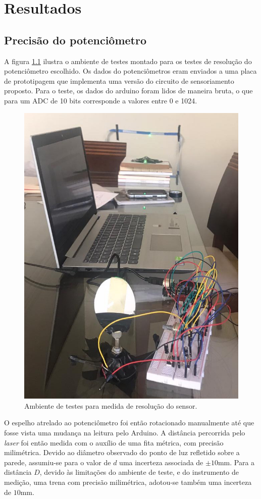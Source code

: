 \chapter{Resultados}

\label{CapResultados}

\section{Precisão do potenciômetro}
A figura \ref{fig:result-resolution} ilustra o ambiente de testes montado para os
testes de resolução do potenciômetro escolhido. Os dados do potenciômetros eram 
enviados a uma placa de prototipagem que implementa uma versão do circuito
de sensoriamento proposto. Para o teste, os dados do arduino foram lidos de 
maneira bruta, o que para um ADC de 10 bits corresponde a valores entre 0 e 1024.

\begin{figure}[h]
    \caption{Ambiente de testes para medida de resolução do sensor.}

    \begin{centering}
        \includegraphics[width=0.5\columnwidth]{images/resultados/resolution.jpg} 
    \par\end{centering}

    \label{fig:result-resolution}
\end{figure}

O espelho atrelado ao potenciômetro foi então rotacionado manualmente até
que fosse vista uma mudança na leitura pelo Arduino. A distância percorrida
pelo \textit{laser} foi então medida com o auxílio de uma fita métrica, com
precisão milimétrica. Devido ao diâmetro observado do ponto de luz refletido 
sobre a parede, assumiu-se para o valor de $d$ uma incerteza associada de $\pm 10$mm.
Para a distância $D$, devido às limitações do ambiente de teste, e do instrumento de 
medição, uma trena com precisão milimétrica, adotou-se também uma incerteza de $10$mm.

